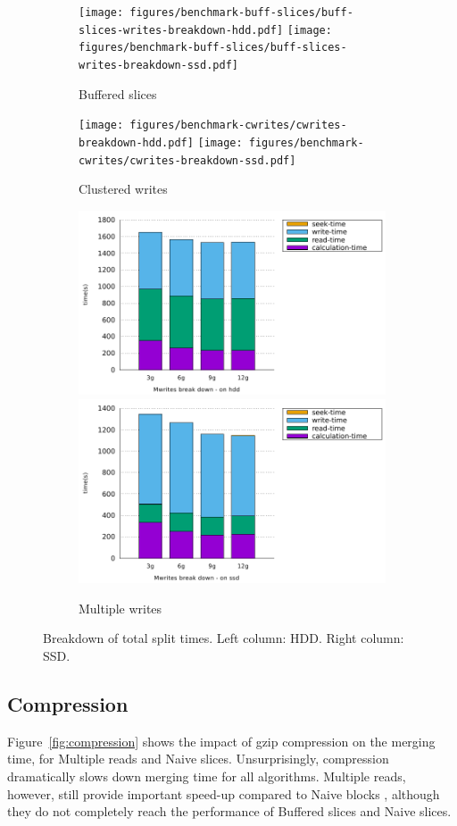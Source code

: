 \documentclass[10pt, conference, compsocconf]{IEEEtran}
\newcommand{\todo}[1]{\marginpar{\parbox{18mm}{\flushleft\tiny\color{red}\textbf{TODO}:
      #1}}}
\begin{document}
\begin{figure}
  \begin{subfigure}[b]{\columnwidth}
    \texttt{[image: figures/benchmark-buff-slices/buff-slices-writes-breakdown-hdd.pdf]}
    \texttt{[image: figures/benchmark-buff-slices/buff-slices-writes-breakdown-ssd.pdf]}
    \caption{Buffered slices}
  \end{subfigure}
  \begin{subfigure}[b]{\columnwidth}
    \texttt{[image: figures/benchmark-cwrites/cwrites-breakdown-hdd.pdf]}
    \texttt{[image: figures/benchmark-cwrites/cwrites-breakdown-ssd.pdf]}
    \caption{Clustered writes}
  \end{subfigure}
  \begin{subfigure}[b]{\columnwidth}
    \includegraphics[width=0.45\columnwidth]{figures/benchmark-mwrites/mwrites-breakdown-hdd.pdf}
    \includegraphics[width=0.45\columnwidth]{figures/benchmark-mwrites/mwrites-breakdown-ssd.pdf}
    \caption{Multiple writes}
  \end{subfigure}
  \caption{Breakdown of total split times. Left column: HDD. Right column: SSD.}
  \label{fig:breakdowns-ssd-split}
\end{figure}

\subsection{Compression}

Figure~\ref{fig:compression} shows the impact of gzip compression on
the merging time, for Multiple reads and Naive slices.
Unsurprisingly, compression dramatically slows down merging time for
all algorithms. Multiple reads, however, still provide important
speed-up compared to Naive blocks \todo{check that}, although they do
not completely reach the performance of Buffered slices and Naive
slices.
\end{document}
